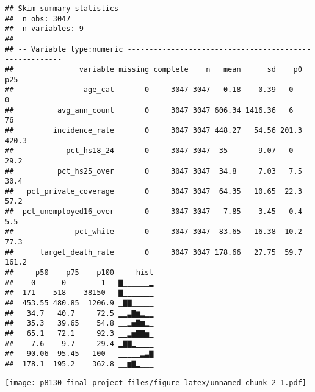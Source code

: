 \documentclass[]{article}
\newenvironment{Shaded}{\begin{snugshade}}{\end{snugshade}}
\newcommand{\KeywordTok}[1]{\textcolor[rgb]{0.13,0.29,0.53}{\textbf{#1}}}
\newcommand{\DataTypeTok}[1]{\textcolor[rgb]{0.13,0.29,0.53}{#1}}
\newcommand{\DecValTok}[1]{\textcolor[rgb]{0.00,0.00,0.81}{#1}}
\newcommand{\StringTok}[1]{\textcolor[rgb]{0.31,0.60,0.02}{#1}}
\newcommand{\OperatorTok}[1]{\textcolor[rgb]{0.81,0.36,0.00}{\textbf{#1}}}
\newcommand{\NormalTok}[1]{#1}
\begin{document}
\begin{verbatim}
## Skim summary statistics
##  n obs: 3047 
##  n variables: 9 
## 
## -- Variable type:numeric -------------------------------------------------------
##               variable missing complete    n   mean      sd    p0   p25
##                age_cat       0     3047 3047   0.18    0.39   0     0  
##          avg_ann_count       0     3047 3047 606.34 1416.36   6    76  
##         incidence_rate       0     3047 3047 448.27   54.56 201.3 420.3
##            pct_hs18_24       0     3047 3047  35       9.07   0    29.2
##          pct_hs25_over       0     3047 3047  34.8     7.03   7.5  30.4
##   pct_private_coverage       0     3047 3047  64.35   10.65  22.3  57.2
##  pct_unemployed16_over       0     3047 3047   7.85    3.45   0.4   5.5
##              pct_white       0     3047 3047  83.65   16.38  10.2  77.3
##      target_death_rate       0     3047 3047 178.66   27.75  59.7 161.2
##     p50    p75    p100     hist
##    0      0        1   ▇▁▁▁▁▁▁▂
##  171    518    38150   ▇▁▁▁▁▁▁▁
##  453.55 480.85  1206.9 ▁▇▇▁▁▁▁▁
##   34.7   40.7     72.5 ▁▁▃▇▆▂▁▁
##   35.3   39.65    54.8 ▁▁▂▅▇▆▂▁
##   65.1   72.1     92.3 ▁▁▂▅▇▇▅▁
##    7.6    9.7     29.4 ▂▇▇▂▁▁▁▁
##   90.06  95.45   100   ▁▁▁▁▁▂▃▇
##  178.1  195.2    362.8 ▁▁▆▇▂▁▁▁
\end{verbatim}

\begin{Shaded}
\end{Shaded}

\texttt{[image: p8130\_final\_project\_files/figure-latex/unnamed-chunk-2-1.pdf]}
\end{document}

